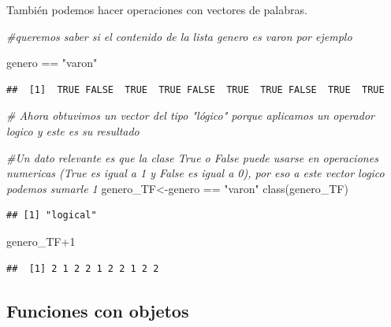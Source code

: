 \documentclass[
]{book}
\newenvironment{Shaded}{\begin{snugshade}}{\end{snugshade}}
\newcommand{\CommentTok}[1]{\textcolor[rgb]{0.56,0.35,0.01}{\textit{#1}}}
\newcommand{\DecValTok}[1]{\textcolor[rgb]{0.00,0.00,0.81}{#1}}
\newcommand{\FunctionTok}[1]{\textcolor[rgb]{0.00,0.00,0.00}{#1}}
\newcommand{\NormalTok}[1]{#1}
\newcommand{\OtherTok}[1]{\textcolor[rgb]{0.56,0.35,0.01}{#1}}
\newcommand{\SpecialCharTok}[1]{\textcolor[rgb]{0.00,0.00,0.00}{#1}}
\newcommand{\StringTok}[1]{\textcolor[rgb]{0.31,0.60,0.02}{#1}}
\begin{document}
También podemos hacer operaciones con vectores de palabras.

\begin{Shaded}
\begin{Highlighting}[]
\CommentTok{\#queremos saber si el contenido de la lista genero es varon por ejemplo}

\NormalTok{genero }\SpecialCharTok{==} \StringTok{"varon"}
\end{Highlighting}
\end{Shaded}

\begin{verbatim}
##  [1]  TRUE FALSE  TRUE  TRUE FALSE  TRUE  TRUE FALSE  TRUE  TRUE
\end{verbatim}

\begin{Shaded}
\begin{Highlighting}[]
\CommentTok{\# Ahora obtuvimos un vector del tipo "lógico" porque aplicamos un operador logico y este es su resultado}
\end{Highlighting}
\end{Shaded}

\begin{Shaded}
\begin{Highlighting}[]
\CommentTok{\#Un dato relevante es que la clase True o False puede usarse en operaciones numericas (True es igual a 1 y False es igual a 0), por eso a este vector logico podemos sumarle 1}
\NormalTok{genero\_TF}\OtherTok{\textless{}{-}}\NormalTok{genero }\SpecialCharTok{==} \StringTok{"varon"}
\FunctionTok{class}\NormalTok{(genero\_TF)}
\end{Highlighting}
\end{Shaded}

\begin{verbatim}
## [1] "logical"
\end{verbatim}

\begin{Shaded}
\begin{Highlighting}[]
\NormalTok{genero\_TF}\SpecialCharTok{+}\DecValTok{1}
\end{Highlighting}
\end{Shaded}

\begin{verbatim}
##  [1] 2 1 2 2 1 2 2 1 2 2
\end{verbatim}

\hypertarget{funciones-con-objetos}{%
\subsection{Funciones con objetos}\label{funciones-con-objetos}}
\end{document}
